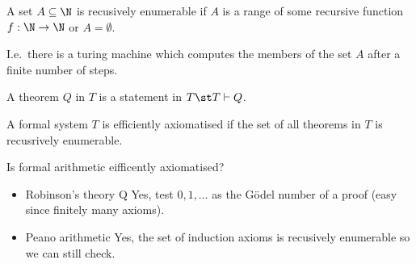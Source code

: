 \documentclass{article}
\begin{document}
\begin{definition}
    A set \(A \subseteq \N\) is recusively enumerable if
    \(A\) is a range of some recursive function \(f:\N\to\N\)
    or \(A = \emptyset\).
    
    I.e.\ there is a turing machine which computes the members of the set \(A\)
    after a finite number of steps.
\end{definition}
\begin{definition}[Theorem]
    A theorem \(Q\) in \(T\) is a statement in \(T \st T \vdash Q\).
\end{definition}
\begin{definition}
    A formal system \(T\) is efficiently axiomatised if
    the set of all theorems in \(T\) is recusrively enumerable.
\end{definition}
Is formal arithmetic eifficently axiomatised?
\begin{itemize}
    \item Robinson's theory Q
        \rightarrow Yes, test \(0, 1, \ldots\) as the Gödel number of a proof
        (easy since finitely many axioms).
    \item Peano arithmetic
        \rightarrow Yes, the set of induction axioms
        is recusively enumerable so we can still check.
\end{itemize} 
\end{document}
